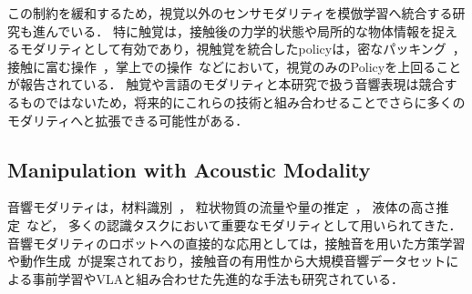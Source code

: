 \documentclass{article}
\begin{document}
この制約を緩和するため，視覚以外のセンサモダリティを模倣学習へ統合する研究も進んでいる．
特に触覚は，接触後の力学的状態や局所的な物体情報を捉えるモダリティとして有効であり，視触覚を統合したpolicyは，密なパッキング~\citep{seehearfeel}，接触に富む操作~\citep{vtt2022,sts_il2024,vitamin2024,tacthru2025}，掌上での操作~\citep{neuralfeels2024}などにおいて，視覚のみのPolicyを上回ることが報告されている．
触覚や言語のモダリティと本研究で扱う音響表現は競合するものではないため，将来的にこれらの技術と組み合わせることでさらに多くのモダリティへと拡張できる可能性がある．



\subsection{Manipulation with Acoustic Modality}
音響モダリティは，材料識別~\citep{eppe2018interactive,jin2019openenv}，
粒状物質の流量や量の推定~\citep{clarke2018learning,wilson2019pouring}，
液体の高さ推定~\citep{liang2020audiopouring,du2021robotpouring}など，
多くの認識タスクにおいて重要なモダリティとして用いられてきた．
音響モダリティのロボットへの直接的な応用としては，接触音を用いた方策学習\citep{seehearfeel,maniwav}や動作生成~\citep{thatsoundsright}が提案されており，接触音の有用性から大規模音響データセットによる事前学習\citep{hearingtouch2024}やVLAと組み合わせた先進的な手法\citep{audiovla}も研究されている．
\end{document}

